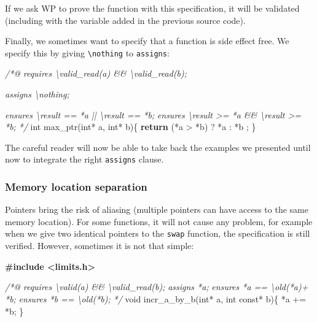 \documentclass[12pt,francais,]{scrbook}
\newenvironment{Shaded}{}{}
\newcommand{\KeywordTok}[1]{\textcolor[rgb]{0.00,0.44,0.13}{\textbf{{#1}}}}
\newcommand{\DataTypeTok}[1]{\textcolor[rgb]{0.56,0.13,0.00}{{#1}}}
\newcommand{\CommentTok}[1]{\textcolor[rgb]{0.38,0.63,0.69}{\textit{{#1}}}}
\newcommand{\ErrorTok}[1]{\textcolor[rgb]{1.00,0.00,0.00}{\textbf{{#1}}}}
\newcommand{\NormalTok}[1]{{#1}}
\begin{document}
If we ask WP to prove the function with this specification, it will be
validated (including with the variable added in the previous source
code).

Finally, we sometimes want to specify that a function is side effect
free. We specify this by giving \texttt{\textbackslash{}nothing} to
\texttt{assigns}:

\begin{footnotesize}\begin{Shaded}
\begin{Highlighting}[]
\CommentTok{/*@}
\CommentTok{  requires \textbackslash{}valid_read(a) && \textbackslash{}valid_read(b);}

\CommentTok{  assigns  \textbackslash{}nothing;}

\CommentTok{  ensures \textbackslash{}result == *a || \textbackslash{}result == *b;}
\CommentTok{  ensures \textbackslash{}result >= *a && \textbackslash{}result >= *b;}
\CommentTok{*/}
\DataTypeTok{int} \NormalTok{max_ptr(}\DataTypeTok{int}\NormalTok{* a, }\DataTypeTok{int}\NormalTok{* b)\{}
  \KeywordTok{return} \NormalTok{(*a > *b) ? *a : *b ;}
\NormalTok{\}}
\end{Highlighting}
\end{Shaded}\end{footnotesize}

The careful reader will now be able to take back the examples we
presented until now to integrate the right \texttt{assigns} clause.

\subsubsection{Memory location
separation}\label{memory-location-separation}

Pointers bring the risk of aliasing (multiple pointers can have access
to the same memory location). For some functions, it will not cause any
problem, for example when we give two identical pointers to the
\texttt{swap} function, the specification is still verified. However,
sometimes it is not that simple:

\begin{footnotesize}\begin{Shaded}
\begin{Highlighting}[]
\ErrorTok{#include <limits.h>}

\CommentTok{/*@}
\CommentTok{  requires \textbackslash{}valid(a) && \textbackslash{}valid_read(b);}
\CommentTok{  assigns  *a;}
\CommentTok{  ensures  *a == \textbackslash{}old(*a)+ *b;}
\CommentTok{  ensures  *b == \textbackslash{}old(*b);}
\CommentTok{*/}
\DataTypeTok{void} \NormalTok{incr_a_by_b(}\DataTypeTok{int}\NormalTok{* a, }\DataTypeTok{int} \DataTypeTok{const}\NormalTok{* b)\{}
  \NormalTok{*a += *b;}
\NormalTok{\}}
\end{Highlighting}
\end{Shaded}\end{footnotesize}
\end{document}
